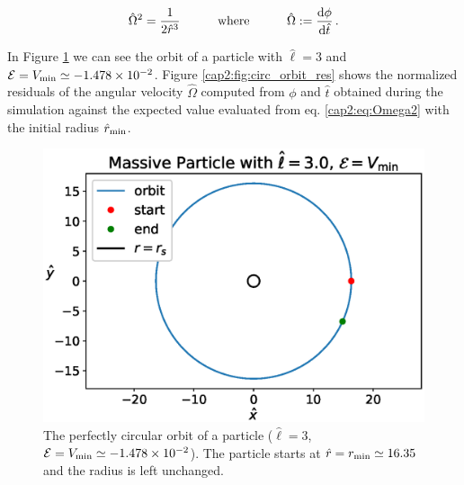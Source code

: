 \begin{equation}
    \hat \Omega^2 = \frac{1}{2 \hat r^3}
    \quad \quad \quad {\rm where} \quad \quad \quad
    \hat \Omega := \dv{\phi}{\hat t} \, .
    \label{cap2:eq:Omega2}
\end{equation}

In Figure \ref{cap2:fig:circ_orbit} we can see the orbit of a particle with
$\hat \ell = 3$ and $\mathcal E = V_{\rm min} \simeq
\num{-1.478e-02}$.
Figure \ref{cap2:fig:circ_orbit_res} shows the normalized residuals of the
angular velocity $\hat \Omega$ computed from $\phi$ and $\hat t$ obtained
during the simulation against the expected value evaluated from eq.
\ref{cap2:eq:Omega2} with the initial radius $\hat r_{\rm min}$.

\begin{figure}[h]
    \begin{minipage}{0.48\textwidth}
        \centering
        \includegraphics[width=\textwidth]{Figures/chapter2/circ.eps}
        \caption{The perfectly circular orbit of a particle ($\hat \ell = 3$,
        $\mathcal E = V_{\rm min} \simeq \num{-1.478e-02}$).
        The particle starts at $\hat r = r_{\rm min} \simeq 16.35$ and the
        radius is left unchanged.}
        \label{cap2:fig:circ_orbit}
    \end{minipage}
    \hspace{0.015 \textwidth}
    \begin{minipage}{0.48\textwidth}
        \centering

\end{minipage}
\end{figure}
